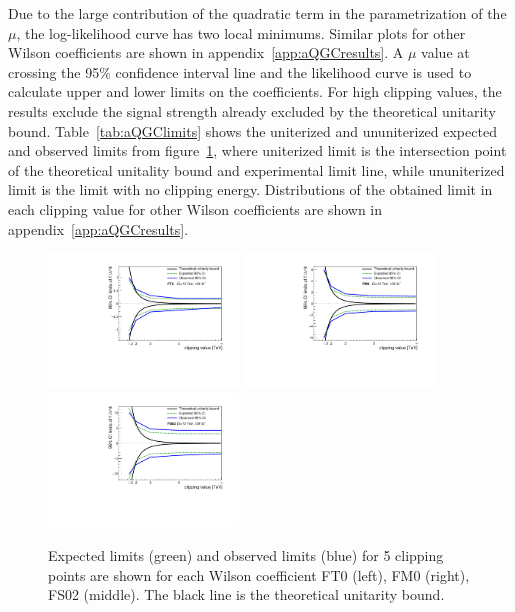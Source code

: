 Due to the large contribution of the quadratic term in the parametrization of the $\mu$, the log-likelihood curve has two local minimums.
Similar plots for other Wilson coefficients are shown in appendix~\ref{app:aQGCresults}. 
A $\mu$ value at crossing the 95\% confidence interval line and the likelihood curve is used to calculate upper and lower limits on the coefficients. 
For high clipping values, the results exclude the signal strength already excluded by the theoretical unitarity bound.
Table~\ref{tab:aQGClimits} shows the uniterized and ununiterized expected and observed limits from figure~\ref{fig:aQGClimits}, where uniterized limit is the intersection point of the theoretical unitality bound and experimental limit line, while ununiterized limit is the limit with no clipping energy.
Distributions of the obtained limit in each clipping value for other Wilson coefficients are shown in appendix~\ref{app:aQGCresults}.
\begin{figure}[ht]
    \centering
     \includegraphics[width=0.45\textwidth]{figures/aQGC/FT0limit.pdf}
    	\includegraphics[width=0.45\textwidth]{figures/aQGC/FM0limit.pdf}
    	\includegraphics[width=0.45\textwidth]{figures/aQGC/FS02limit.pdf} 
        \caption{Expected limits (green) and observed limits (blue) for 5 clipping points are shown for each Wilson coefficient FT0 (left), FM0 (right), FS02 (middle). The black line is the theoretical unitarity bound.}
        \label{fig:aQGClimits}
\end{figure}

